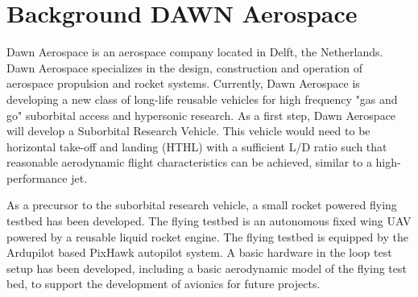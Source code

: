 \chapter{Background DAWN Aerospace}
Dawn Aerospace is an aerospace company located in Delft, the Netherlands. Dawn Aerospace
specializes in the design, construction and operation of aerospace propulsion and rocket systems.
Currently, Dawn Aerospace is developing a new class of long-life reusable vehicles for high frequency
"gas and go" suborbital access and hypersonic research. As a first step, Dawn Aerospace will develop
a Suborbital Research Vehicle. This vehicle would need to be horizontal take-off and landing (HTHL)
with a sufficient L/D ratio such that reasonable aerodynamic flight characteristics can be achieved,
similar to a high-performance jet.

As a precursor to the suborbital research vehicle, a small rocket powered flying testbed has been
developed. The flying testbed is an autonomous fixed wing UAV powered by a reusable liquid rocket
engine. The flying testbed is equipped by the Ardupilot based PixHawk autopilot system. A basic
hardware in the loop test setup has been developed, including a basic aerodynamic model of the
flying test bed, to support the development of avionics for future projects.

